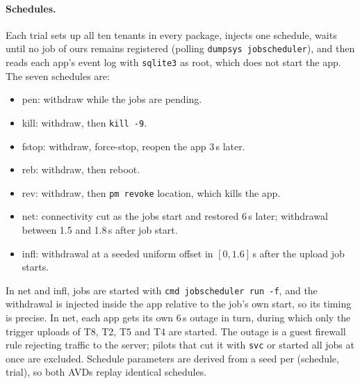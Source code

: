 \paragraph{Schedules.} Each trial sets up all ten tenants in every package, injects one schedule, waits until no job of
ours remains registered (polling \texttt{dumpsys jobscheduler}), and then reads each app's event log with \texttt{sqlite3}
as root, which does not start the app. The seven schedules are:
\begin{itemize}[leftmargin=*,nosep]
\item \textsf{pen}: withdraw while the jobs are pending.
\item \textsf{kill}: withdraw, then \texttt{kill -9}.
\item \textsf{fstop}: withdraw, force-stop, reopen the app 3\,s later.
\item \textsf{reb}: withdraw, then reboot.
\item \textsf{rev}: withdraw, then \texttt{pm revoke} location, which kills the app.
\item \textsf{net}: connectivity cut as the jobs start and restored 6\,s later; withdrawal between 1.5 and 1.8\,s after job start.
\item \textsf{infl}: withdrawal at a seeded uniform offset in $[0,1.6]$\,s after the upload job starts.
\end{itemize}
In \textsf{net} and \textsf{infl}, jobs are started with \texttt{cmd jobscheduler run -f}, and the withdrawal is injected
inside the app relative to the job's own start, so its timing is precise. In \textsf{net}, each app gets its own 6\,s outage in
turn, during which only the trigger uploads of T8, T2, T5 and T4 are started. The outage is a guest firewall rule rejecting traffic to the
server; pilots that cut it with \texttt{svc} or started all jobs at once are excluded. Schedule parameters are derived from a seed per
(schedule, trial), so both AVDs replay identical schedules.

